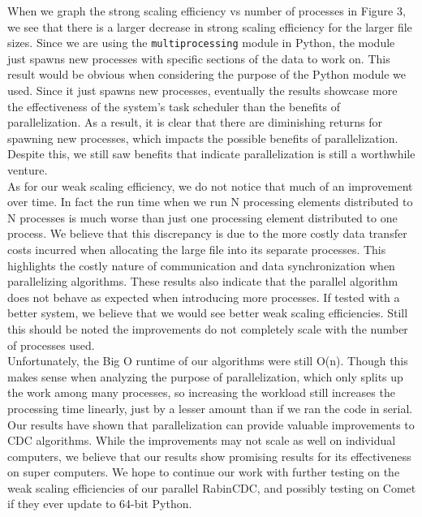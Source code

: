 \documentclass{acmtog} %
\begin{document}
	When we graph the strong scaling efficiency vs number of processes in Figure 3, we see that there is a larger decrease in strong scaling efficiency for the larger file sizes. Since we are using the \texttt{multiprocessing} module in Python, the module just spawns new processes with specific sections of the data to work on. This result would be obvious when considering the purpose of the Python module we used. Since it just spawns new processes, eventually the results showcase more the effectiveness of the system's task scheduler than the benefits of parallelization. As a result, it is clear that there are diminishing returns for spawning new processes, which impacts the possible benefits of parallelization. Despite this, we still saw benefits that indicate parallelization is still a worthwhile venture.  \\
	
	As for our weak scaling efficiency, we do not notice that much of an improvement over time. In fact the run time when we run N processing elements distributed to N processes is much worse than just one processing element distributed to one process. We believe that this discrepancy is due to the more costly data transfer costs incurred when allocating the large file into its separate processes. This highlights the costly nature of communication and data synchronization when parallelizing algorithms. These results also indicate that the parallel algorithm does not behave as expected when introducing more processes. If tested with a better system, we believe that we would see better weak scaling efficiencies. Still this should be noted the improvements do not completely scale with the number of processes used.\\
	
	Unfortunately, the Big O runtime of our algorithms were still O(n). Though this makes sense when analyzing the purpose of parallelization, which only splits up the work among many processes, so increasing the workload still increases the processing time linearly, just by a lesser amount than if we ran the code in serial. \\
	
	Our results have shown that parallelization can provide valuable improvements to CDC algorithms. While the improvements may not scale as well on individual computers, we believe that our results show promising results for its effectiveness on super computers. We hope to continue our work with further testing on the weak scaling efficiencies of our parallel RabinCDC, and possibly testing on Comet if they ever update to 64-bit Python. 
\end{document}

